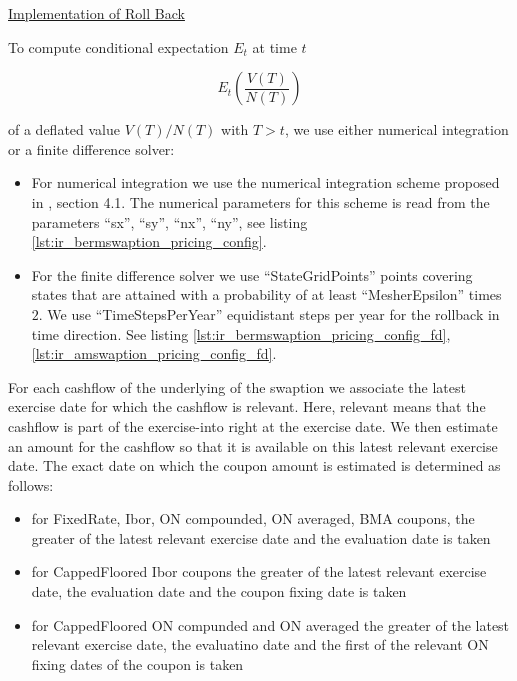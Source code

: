 \underline{Implementation of Roll Back}

To compute conditional expectation $E_t$ at time $t$

\begin{equation}
  E_t \left( \frac{V(T)}{N(T)} \right)
\end{equation}

of a deflated value $V(T) / N(T)$ with $T>t$, we use either numerical integration or a finite difference solver:

\begin{itemize}
\item For numerical integration we use the numerical integration scheme proposed in \cite{Hagan_Bermudan},
section 4.1. The numerical parameters for this scheme is read from the parameters ``sx'', ``sy'', ``nx'', ``ny'', see
listing \ref{lst:ir_bermswaption_pricing_config}.
\item For the finite difference solver we use ``StateGridPoints'' points covering states that are attained
with a probability of at least ``MesherEpsilon'' times $2$. We use ``TimeStepsPerYear'' equidistant steps per year for
the rollback in time direction. See
listing \ref{lst:ir_bermswaption_pricing_config_fd}, \ref{lst:ir_amswaption_pricing_config_fd}.
\end{itemize}

For each cashflow of the underlying of the swaption we associate the latest exercise date for which the cashflow is
relevant. Here, relevant means that the cashflow is part of the exercise-into right at the exercise date. We then
estimate an amount for the cashflow so that it is available on this latest relevant exercise date. The exact date on
which the coupon amount is estimated is determined as follows:

\begin{itemize}
  \item for FixedRate, Ibor, ON compounded, ON averaged, BMA coupons, the greater of the latest relevant exercise date
    and the evaluation date is taken
  \item for CappedFloored Ibor coupons the greater of the latest relevant exercise date, the evaluation date and the coupon fixing date is taken
  \item for CappedFloored ON compunded and ON averaged the greater of the latest relevant exercise date, the evaluatino
    date and the first of the relevant ON fixing dates of the coupon is taken
\end{itemize}

